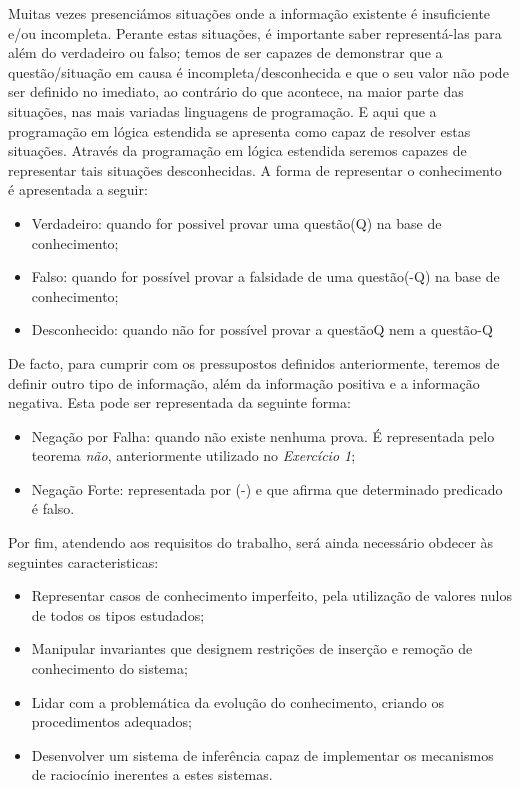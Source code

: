 Muitas vezes presenciámos situações onde a informação existente é insuficiente e/ou incompleta.
Perante estas situações, é importante saber representá-las para além do verdadeiro ou
falso; temos de ser capazes de demonstrar que a questão/situação em causa é incompleta/desconhecida
e que o seu valor não pode ser definido no imediato, ao contrário do que acontece,
na maior parte das situações, nas mais variadas linguagens de programação.
E aqui que a programação em lógica estendida se apresenta como capaz de resolver estas
situações. Através da programação em lógica estendida seremos capazes de representar tais
situações desconhecidas. A forma de representar o conhecimento é apresentada a seguir:


\begin{itemize}
	\item Verdadeiro: quando for possivel provar uma questão(Q) na base de conhecimento; 
	\item Falso: quando for possível provar a falsidade de uma questão(-Q) na base de conhecimento;
	\item Desconhecido: quando não for possível provar a questãoQ nem a questão-Q
\end{itemize}


De facto, para cumprir com os pressupostos definidos anteriormente, teremos de definir outro tipo de informação, além da informação positiva e a informação negativa. Esta pode ser
representada da seguinte forma:


\begin{itemize}
	\item Negação por Falha: quando não existe nenhuma prova. É representada pelo teorema \textit{não}, anteriormente utilizado no \textit{Exercício 1};
	\item Negação Forte:  representada por (-) e que afirma que determinado predicado é falso.
\end{itemize}

Por fim, atendendo aos requisitos do trabalho, será ainda necessário obdecer às seguintes
caracteristicas:

\begin{itemize}
	\item Representar casos de conhecimento imperfeito, pela utilização de valores nulos de todos os tipos estudados;
	\item Manipular invariantes que designem restrições de inserção e remoção de conhecimento do sistema; 
	\item Lidar com a problemática da evolução do conhecimento, criando os procedimentos adequados;
	\item Desenvolver um sistema de inferência capaz de implementar os mecanismos de raciocínio inerentes a estes sistemas.

\end{itemize}

